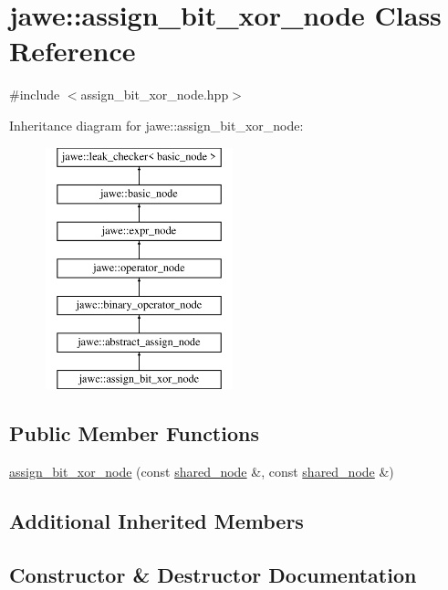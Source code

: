 \hypertarget{classjawe_1_1assign__bit__xor__node}{}\section{jawe\+:\+:assign\+\_\+bit\+\_\+xor\+\_\+node Class Reference}
\label{classjawe_1_1assign__bit__xor__node}


{\ttfamily \#include $<$assign\+\_\+bit\+\_\+xor\+\_\+node.\+hpp$>$}

Inheritance diagram for jawe\+:\+:assign\+\_\+bit\+\_\+xor\+\_\+node\+:\begin{figure}[H]
\begin{center}
\leavevmode
\includegraphics[height=7.000000cm]{classjawe_1_1assign__bit__xor__node}
\end{center}
\end{figure}
\subsection*{Public Member Functions}
\begin{DoxyCompactItemize}
\item 
\hyperlink{classjawe_1_1assign__bit__xor__node_ab8852a627f26d297efc252f4c31d2007}{assign\+\_\+bit\+\_\+xor\+\_\+node} (const \hyperlink{namespacejawe_a3f307481d921b6cbb50cc8511fc2b544}{shared\+\_\+node} \&, const \hyperlink{namespacejawe_a3f307481d921b6cbb50cc8511fc2b544}{shared\+\_\+node} \&)
\end{DoxyCompactItemize}
\subsection*{Additional Inherited Members}


\subsection{Constructor \& Destructor Documentation}
\mbox{\label{classjawe_1_1assign__bit__xor__node_ab8852a627f26d297efc252f4c31d2007}} 
